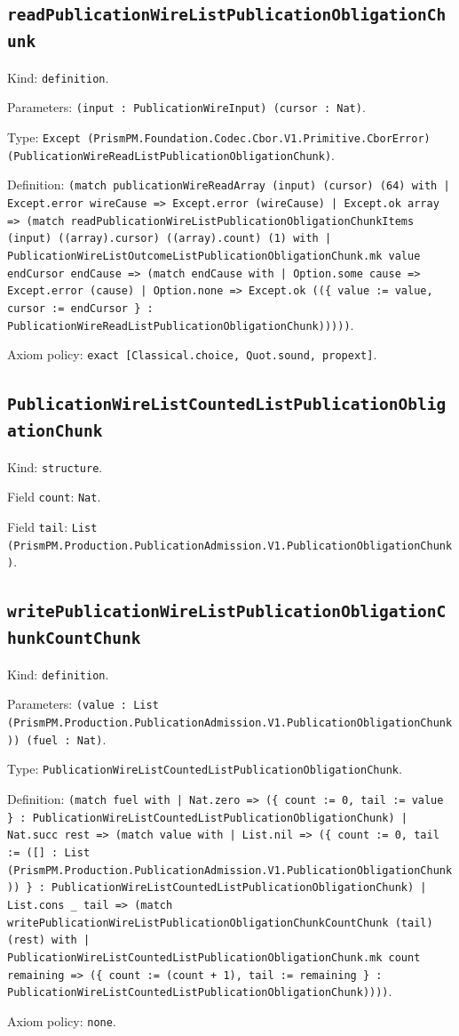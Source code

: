 \documentclass[11pt]{article}
\begin{document}
\subsection*{\texttt{readPublicationWireListPublicationObligationChunk}}
\noindent Kind: \texttt{definition}.\par
\noindent Parameters: \texttt{(input : PublicationWireInput) (cursor : Nat)}.\par
\noindent Type: \texttt{Except (PrismPM.Foundation.Codec.Cbor.V1.Primitive.CborError) (PublicationWireReadListPublicationObligationChunk)}.\par
\noindent Definition: \texttt{(match publicationWireReadArray (input) (cursor) (64) with | Except.error wireCause => Except.error (wireCause) | Except.ok array => (match readPublicationWireListPublicationObligationChunkItems (input) ((array).cursor) ((array).count) (1) with | PublicationWireListOutcomeListPublicationObligationChunk.mk value endCursor endCause => (match endCause with | Option.some cause => Except.error (cause) | Option.none => Except.ok ((\{ value := value, cursor := endCursor \} : PublicationWireReadListPublicationObligationChunk)))))}.\par
\noindent Axiom policy: \texttt{exact [Classical.choice, Quot.sound, propext]}.\par
\subsection*{\texttt{PublicationWireListCountedListPublicationObligationChunk}}
\noindent Kind: \texttt{structure}.\par
\noindent Field \texttt{count}: \texttt{Nat}.\par
\noindent Field \texttt{tail}: \texttt{List (PrismPM.Production.PublicationAdmission.V1.PublicationObligationChunk)}.\par
\subsection*{\texttt{writePublicationWireListPublicationObligationChunkCountChunk}}
\noindent Kind: \texttt{definition}.\par
\noindent Parameters: \texttt{(value : List (PrismPM.Production.PublicationAdmission.V1.PublicationObligationChunk)) (fuel : Nat)}.\par
\noindent Type: \texttt{PublicationWireListCountedListPublicationObligationChunk}.\par
\noindent Definition: \texttt{(match fuel with | Nat.zero => (\{ count := 0, tail := value \} : PublicationWireListCountedListPublicationObligationChunk) | Nat.succ rest => (match value with | List.nil => (\{ count := 0, tail := ([] : List (PrismPM.Production.PublicationAdmission.V1.PublicationObligationChunk)) \} : PublicationWireListCountedListPublicationObligationChunk) | List.cons \_ tail => (match writePublicationWireListPublicationObligationChunkCountChunk (tail) (rest) with | PublicationWireListCountedListPublicationObligationChunk.mk count remaining => (\{ count := (count + 1), tail := remaining \} : PublicationWireListCountedListPublicationObligationChunk))))}.\par
\noindent Axiom policy: \texttt{none}.\par
\end{document}
